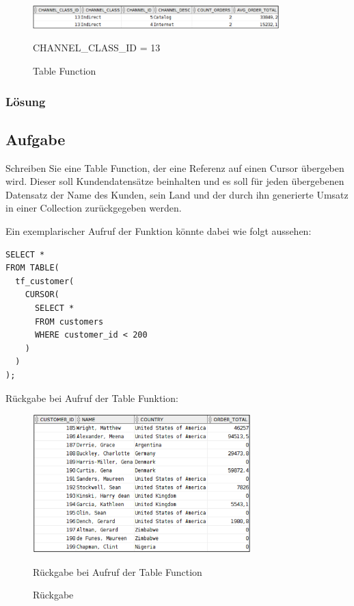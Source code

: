 \begin{figure}[H]
  \centering
  \includegraphics[width=0.85\textwidth]{img//uebung_02_-_aufgabe_02.png}
  \label{img:uebung_02_-_aufgabe_02}
  \caption{Table Function}{CHANNEL\_CLASS\_ID = 13}
\end{figure} 


\subsubsection*{Lösung}
\label{subsubsec:uebung_02.aufgabe_02.loesung}


\subsection{Aufgabe}
\label{subsec:uebung_02.aufgabe_03}
Schreiben Sie eine Table Function, der eine Referenz auf einen Cursor übergeben wird. Dieser soll Kundendatensätze beinhalten und es soll für jeden übergebenen Datensatz der Name des Kunden, sein Land und der durch ihn generierte Umsatz in einer Collection zurückgegeben werden.

Ein exemplarischer Aufruf der Funktion könnte dabei wie folgt aussehen:
\begin{verbatim}
SELECT *
FROM TABLE(
  tf_customer(
    CURSOR(
      SELECT *
      FROM customers
      WHERE customer_id < 200
    )
  )
);
\end{verbatim}

Rückgabe bei Aufruf der Table Funktion:
\begin{figure}[H]
  \centering
  \includegraphics[width=0.75\textwidth]{img//uebung_02_-_aufgabe_03.png}
  \label{img:uebung_02_-_aufgabe_03}
  \caption{Rückgabe}{Rückgabe bei Aufruf der Table Function}
\end{figure} 

